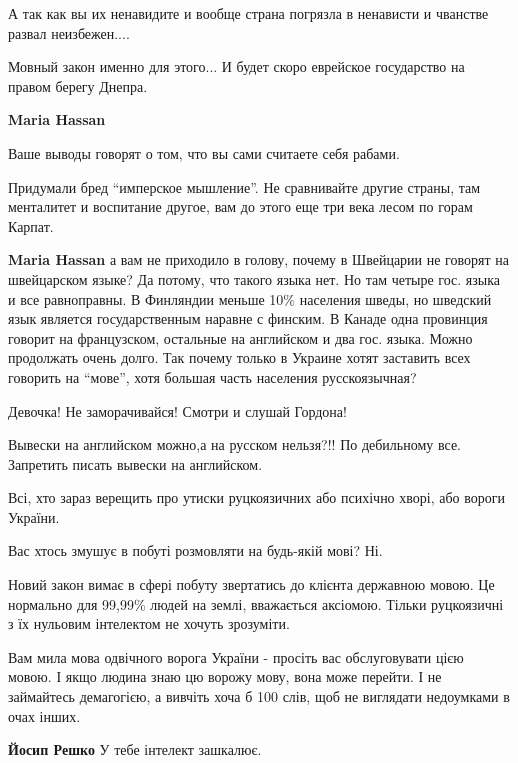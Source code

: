 \begin{itemize}
\begin{itemize}
А так как вы их ненавидите и вообще страна погрязла в ненависти и чванстве развал неизбежен....

Мовный закон именно для этого... И будет скоро еврейское государство на правом берегу Днепра.


\textbf{Maria Hassan} 

Ваше выводы говорят о том, что вы сами считаете себя рабами.

Придумали бред \enquote{имперское мышление}. Не сравнивайте другие страны, там
менталитет и воспитание другое, вам до этого еще три века лесом по горам
Карпат.


\textbf{Maria Hassan} а вам не приходило в голову, почему в Швейцарии не
говорят на швейцарском языке? Да потому, что такого языка нет. Но там четыре
гос. языка и все равноправны. В Финляндии меньше 10\% населения шведы, но
шведский язык является государственным наравне с финским. В Канаде одна
провинция говорит на французском, остальные на английском и два гос. языка.
Можно продолжать очень долго. Так почему только в Украине хотят заставить всех
говорить на \enquote{мове}, хотя большая часть населения русскоязычная?
\end{itemize}

Девочка! Не заморачивайся! Смотри и слушай Гордона!

Вывески на английском можно,а на русском нельзя?!! По дебильному все. Запретить писать вывески на английском.


Всі, хто зараз верещить про утиски руцкоязичних або психічно хворі, або вороги України.

Вас хтось змушує в побуті розмовляти на будь-якій мові?
Ні.

Новий закон вимає в сфері побуту звертатись до клієнта державною мовою. Це
нормально для 99,99\% людей на землі, вважається аксіомою. Тільки руцкоязичні з
їх нульовим інтелектом не хочуть зрозуміти.

Вам мила мова одвічного ворога України - просіть вас обслуговувати цією мовою.
І якщо людина знаю цю ворожу мову, вона може перейти.
І не займайтесь демагогією, а вивчіть хоча б 100 слів, щоб не виглядати
недоумками в очах інших.

\begin{itemize}

\textbf{Йосип Решко} У тебе інтелект зашкалює.



\end{itemize}
\end{itemize}
